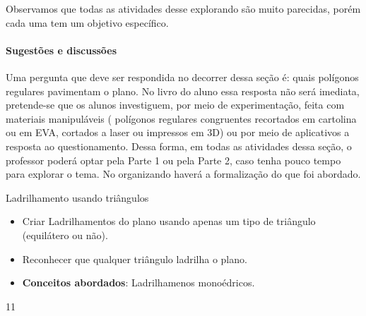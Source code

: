 \clearpage
\def\currentcolor{session1}
\begin{texto}
{


	Observamos que todas as atividades desse explorando são muito parecidas, porém cada uma tem um objetivo específico.

	\paragraph {Sugestões e discussões}

	Uma pergunta que deve ser respondida no decorrer dessa seção é: quais polígonos regulares pavimentam o plano. No livro do aluno essa resposta não será imediata, pretende-se que os alunos investiguem, por meio de experimentação, feita com materiais manipuláveis ( polígonos regulares congruentes recortados em cartolina ou em EVA, cortados a laser ou impressos em 3D) ou por meio de aplicativos a resposta ao questionamento. Dessa forma, em todas as atividades dessa seção, o professor poderá optar pela Parte 1 ou pela Parte 2, caso tenha pouco tempo para explorar o tema. No organizando haverá a formalização do que foi abordado.  
}
\end{texto}
\begin{objectives}{Ladrilhamento usando triângulos}
{
	\begin{itemize}
	\item Criar Ladrilhamentos do plano usando apenas um tipo de triângulo (equilátero ou não).
	\item Reconhecer que qualquer triângulo ladrilha o plano.
	\item \textbf{Conceitos abordados}: Ladrilhamenos monoédricos.
	\end{itemize}
}{1}{1}
\end{objectives}
